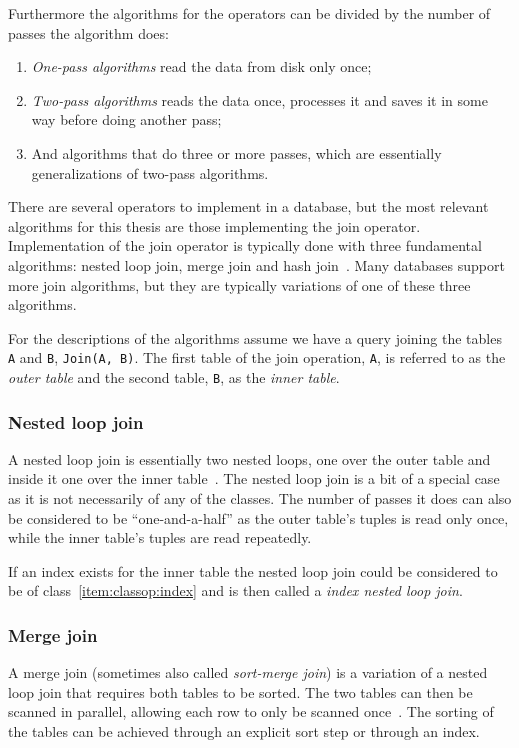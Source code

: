 Furthermore the algorithms for the operators can be divided by the number of
passes the algorithm does:
\begin{enumerate}
\item \textit{One-pass algorithms} read the data from disk only once;
\item \textit{Two-pass algorithms} reads the data once, processes it and saves
  it in some way before doing another pass;
\item And algorithms that do three or more passes, which are essentially
  generalizations of two-pass algorithms.
\end{enumerate}

There are several operators to implement in a database, but the most relevant
algorithms for this thesis are those implementing the join operator.
Implementation of the join operator is typically done with three fundamental
algorithms: nested loop join, merge join and hash join~\cite{postgresql_pd9p}.
Many databases support more join algorithms, but they are typically variations
of one of these three algorithms.

For the descriptions of the algorithms assume we have a query joining the tables
\texttt{A} and \texttt{B}, \texttt{Join(A, B)}. The first table of the join
operation, \texttt{A}, is referred to as the \textit{outer table} and the second
table, \texttt{B}, as the \textit{inner table}.

\subsubsection{Nested loop join}\label{sec:nestedloopjoin}
A nested loop join is essentially two nested loops, one over the outer table and
inside it one over the inner table~\cite[p.
718-722]{garcia-molina_2002_database_dstcb}. The nested loop join is a bit of a
special case as it is not necessarily of any of the classes. The number of
passes it does can also be considered to be ``one-and-a-half'' as the outer
table's tuples is read only once, while the inner table's tuples are read
repeatedly.

If an index exists for the inner table the nested loop join could be considered
to be of class~\ref{item:classop:index} and is then called a \textit{index
  nested loop join}.

\subsubsection{Merge join}
A merge join (sometimes also called \textit{sort-merge join}) is a variation of
a nested loop join that requires both tables to be sorted. The two tables can
then be scanned in parallel, allowing each row to only be scanned
once~\cite[p. 723-730]{garcia-molina_2002_database_dstcb}. The sorting of the
tables can be achieved through an explicit sort step or through an index.

